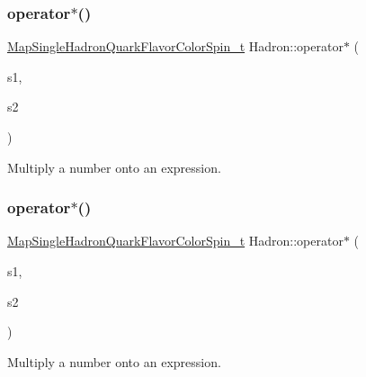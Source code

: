 \subsubsection{\texorpdfstring{operator$\ast$()}{operator*()}\hspace{0.1cm}{\footnotesize\ttfamily [5/6]}}
{\footnotesize\ttfamily \mbox{\hyperlink{namespaceHadron_a03b319764f85c20434f20a269ce5f388}{Map\+Single\+Hadron\+Quark\+Flavor\+Color\+Spin\+\_\+t}} Hadron\+::operator$\ast$ (\begin{DoxyParamCaption}\item[{double}]{s1,  }\item[{const \mbox{\hyperlink{namespaceHadron_a03b319764f85c20434f20a269ce5f388}{Map\+Single\+Hadron\+Quark\+Flavor\+Color\+Spin\+\_\+t}} \&}]{s2 }\end{DoxyParamCaption})}



Multiply a number onto an expression. 

\mbox{\label{namespaceHadron_afeecee88605be038ceda273e796e53fd}} 
\subsubsection{\texorpdfstring{operator$\ast$()}{operator*()}\hspace{0.1cm}{\footnotesize\ttfamily [6/6]}}
{\footnotesize\ttfamily \mbox{\hyperlink{namespaceHadron_a03b319764f85c20434f20a269ce5f388}{Map\+Single\+Hadron\+Quark\+Flavor\+Color\+Spin\+\_\+t}} Hadron\+::operator$\ast$ (\begin{DoxyParamCaption}\item[{const std\+::complex$<$ double $>$ \&}]{s1,  }\item[{const \mbox{\hyperlink{namespaceHadron_a03b319764f85c20434f20a269ce5f388}{Map\+Single\+Hadron\+Quark\+Flavor\+Color\+Spin\+\_\+t}} \&}]{s2 }\end{DoxyParamCaption})}



Multiply a number onto an expression. 

